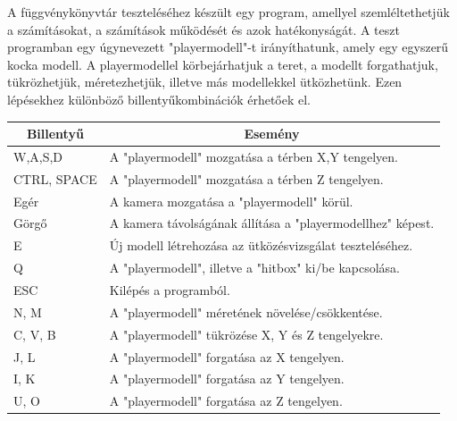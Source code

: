 A függvénykönyvtár teszteléséhez készült egy program, amellyel szemléltethetjük a számításokat, a számítások működését és azok hatékonyságát. A teszt programban egy úgynevezett "playermodell"-t irányíthatunk, amely egy egyszerű kocka modell. A playermodellel körbejárhatjuk a teret, a modellt forgathatjuk, tükrözhetjük, méretezhetjük, illetve más modellekkel ütközhetünk. Ezen lépésekhez különböző billentyűkombinációk érhetőek el.
\begin{table}[h]
	\centering
	\begin{tabular}{|l|l|}
		\hline
		\multicolumn{1}{|c|}{\textbf{Billentyű}} & \multicolumn{1}{c|}{\textbf{Esemény}}\\
		\hline
		 W,A,S,D & {A "playermodell" mozgatása a térben X,Y tengelyen.} \\\hline
		 CTRL, SPACE & A "playermodell" mozgatása a térben Z tengelyen. \\\hline
		 Egér & A kamera mozgatása a "playermodell" körül. \\\hline
		 Görgő & A kamera távolságának állítása a "playermodellhez" képest. \\\hline
		 E & Új modell létrehozása az ütközésvizsgálat teszteléséhez. \\\hline
		 Q & A "playermodell", illetve a "hitbox" ki/be kapcsolása. \\\hline
		 ESC & Kilépés a programból. \\\hline
		 N, M & A "playermodell" méretének növelése/csökkentése. \\\hline
		 C, V, B & A "playermodell" tükrözése X, Y és Z tengelyekre. \\\hline
		 J, L & A "playermodell" forgatása az X tengelyen. \\\hline
		 I, K & A "playermodell" forgatása az Y tengelyen. \\\hline
		 U, O & A "playermodell" forgatása az Z tengelyen. \\\hline
	\end{tabular}
\end{table}

\newpage